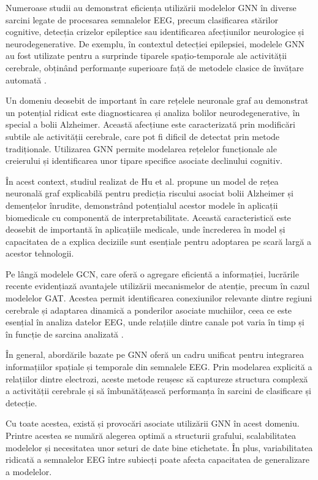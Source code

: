 \documentclass[12pt,a4paper]{report}
\theoremstyle{definition}
\theoremstyle{remark}
\begin{document}
Numeroase studii au demonstrat eficiența utilizării modelelor GNN în diverse sarcini legate de procesarea semnalelor EEG, precum clasificarea stărilor cognitive, detecția crizelor epileptice sau identificarea afecțiunilor neurologice și neurodegenerative. De exemplu, în contextul detecției epilepsiei, modelele GNN au fost utilizate pentru a surprinde tiparele spațio-temporale ale activității cerebrale, obținând performanțe superioare față de metodele clasice de învățare automată \cite{awais2024graphical}.

Un domeniu deosebit de important în care rețelele neuronale graf au demonstrat un potențial ridicat este diagnosticarea și analiza bolilor neurodegenerative, în special a bolii Alzheimer. Această afecțiune este caracterizată prin modificări subtile ale activității cerebrale, care pot fi dificil de detectat prin metode tradiționale. Utilizarea GNN permite modelarea rețelelor funcționale ale creierului și identificarea unor tipare specifice asociate declinului cognitiv.

În acest context, studiul realizat de Hu et al. \cite{hu2024self} propune un model de rețea neuronală graf explicabilă pentru predicția riscului asociat bolii Alzheimer și demențelor înrudite, demonstrând potențialul acestor modele în aplicații biomedicale cu componentă de interpretabilitate. Această caracteristică este deosebit de importantă în aplicațiile medicale, unde încrederea în model și capacitatea de a explica deciziile sunt esențiale pentru adoptarea pe scară largă a acestor tehnologii.

Pe lângă modelele GCN, care oferă o agregare eficientă a informației, lucrările recente evidențiază avantajele utilizării mecanismelor de atenție, precum în cazul modelelor GAT. Acestea permit identificarea conexiunilor relevante dintre regiuni cerebrale și adaptarea dinamică a ponderilor asociate muchiilor, ceea ce este esențial în analiza datelor EEG, unde relațiile dintre canale pot varia în timp și în funcție de sarcina analizată \cite{klepl2023gnn,rahman2025advancement}.

În general, abordările bazate pe GNN oferă un cadru unificat pentru integrarea informațiilor spațiale și temporale din semnalele EEG. Prin modelarea explicită a relațiilor dintre electrozi, aceste metode reușesc să captureze structura complexă a activității cerebrale și să îmbunătățească performanța în sarcini de clasificare și detecție.

Cu toate acestea, există și provocări asociate utilizării GNN în acest domeniu. Printre acestea se numără alegerea optimă a structurii grafului, scalabilitatea modelelor și necesitatea unor seturi de date bine etichetate. În plus, variabilitatea ridicată a semnalelor EEG între subiecți poate afecta capacitatea de generalizare a modelelor.
\end{document}
